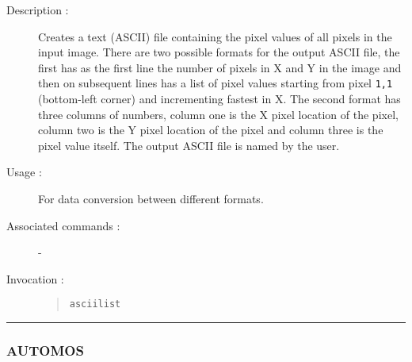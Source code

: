 \begin{description}

\item[Description :] Creates a text (ASCII) file containing the pixel
values of all pixels in the input image.  There are two possible
formats for the output ASCII file, the first has as the first line the
number of pixels in X and Y in the image and then on subsequent lines
has a list of pixel values starting from pixel {\tt 1,1} (bottom-left
corner) and incrementing fastest in X.  The second format has three
columns of numbers, column one is the X pixel location of the pixel,
column two is the Y pixel location of the pixel and column three is the
pixel value itself.  The output ASCII file is named by the user.

\item[Usage :] For data conversion between different formats.
\item[Associated commands :] -
\item[Invocation :]

\begin{quote}{\tt  asciilist }\end{quote}

\end{description}

\hrule
\subsubsection*{\label{AUTOMOS}AUTOMOS}

